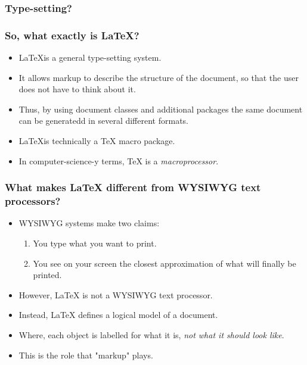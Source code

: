 \documentclass[]{beamer}
\begin{document}
	\begin{frame}[t]
		\frametitle{Type-setting?}

	\end{frame}

	\begin{frame}
		\frametitle{So, what exactly is {\LaTeX}?}
		\begin{itemize}[<+->]
			\item \LaTeX is a general type-setting system. 
			\item It allows markup to describe the structure of the document, so that the user does not have to think about it. 
			\item Thus, by using document classes and additional packages the same document can be generatedd in several different formats.
			\item \LaTeX is technically a {\TeX} macro package.
			\item In computer-science-y terms, {\TeX} is a \emph{macroprocessor}.
		\end{itemize}
	\end{frame}

	\begin{frame}
		\frametitle{What makes {\LaTeX} different from WYSIWYG text processors?}
		\begin{itemize}[<+->]
			\item WYSIWYG systems make two claims:
				\begin{enumerate}
					\item You type what you want to print.
					\item You see on your screen the closest approximation of what will finally be printed.
				\end{enumerate}
			\item However, {\LaTeX} is not a WYSIWYG text processor.
			\item Instead, {\LaTeX} defines a logical model of a document.
			\item Where, each object is labelled for what it is, \emph{not what it should look like}.
			\item This is the role that "markup" plays.
		\end{itemize}
		
	\end{frame}
\end{document}
